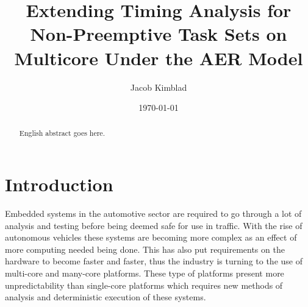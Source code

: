 \documentclass{kththesis}
\title{Extending Timing Analysis for Non-Preemptive Task Sets on Multicore Under the AER Model}
\author{Jacob Kimblad}
\date{\today}
\begin{document}

\frontmatter

\titlepage

\begin{abstract} 

    English abstract goes here.

\end{abstract}


\begin{otherlanguage}{Swedish} 
    
    \begin{abstract}

    \end{abstract} 

\end{otherlanguage}

\printglossary[title={Acronyms}]

\tableofcontents

\mainmatter


\chapter{Introduction} 
Embedded systems in the automotive sector are required to go through a lot of analysis and testing
before being deemed safe for use in traffic. With the rise of autonomous vehicles these systems are
becoming more complex as an effect of more computing needed being done.  This has also put
requirements on the hardware to become faster and faster, thus the industry is turning to the use of
multi-core and many-core platforms. These type of platforms present more unpredictability than
single-core platforms which requires new methods of analysis and deterministic execution of these
systems. 
\end{document}
